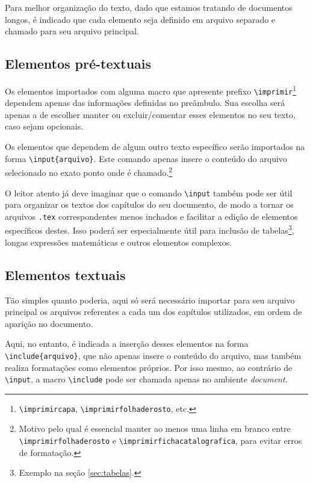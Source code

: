 Para melhor organização do texto, dado que estamos tratando de documentos longos, é indicado que cada elemento seja definido em arquivo separado e chamado para seu arquivo principal.

\subsection{Elementos pré-textuais}
Os elementos importados com alguma macro que apresente prefixo \texttt{\textbackslash imprimir}\footnote{\texttt{\textbackslash imprimircapa}, \texttt{\textbackslash imprimirfolhaderosto}, etc.} dependem apenas das informações definidas no preâmbulo. Sua escolha será apenas a de escolher manter ou excluir/comentar esses elementos no seu texto, caso sejam opcionais.

Os elementos que dependem de algum outro texto específico serão importados na forma \texttt{\textbackslash input\{arquivo\}}. Este comando apenas insere o conteúdo do arquivo selecionado no exato ponto onde é chamado.\footnote{Motivo pelo qual é essencial manter ao menos uma linha em branco entre \texttt{\textbackslash imprimirfolhaderosto} e \texttt{\textbackslash imprimirfichacatalografica}, para evitar erros de formatação.}

O leitor atento já deve imaginar que o comando \texttt{\textbackslash input} também pode ser útil para organizar os textos dos capítulos do seu documento, de modo a tornar os arquivos \texttt{.tex} correspondentes menos inchados e facilitar a edição de elementos específicos destes. Isso poderá ser especialmente útil para inclusão de tabelas\footnote{Exemplo na seção \ref{sec:tabelas}.}, longas expressões matemáticas e outros elementos complexos.

\subsection{Elementos textuais}
Tão simples quanto poderia, aqui só será necessário importar para seu arquivo principal os arquivos referentes a cada um dos capítulos utilizados, em ordem de aparição no documento.

Aqui, no entanto, é indicada a inserção desses elementos na forma \texttt{\textbackslash include\{arquivo\}}, que não apenas insere o conteúdo do arquivo, mas também realiza formatações como elementos próprios. Por isso mesmo, ao contrário de \texttt{\textbackslash input}, a macro \texttt{\textbackslash include} pode ser chamada apenas no ambiente \textit{document}.

